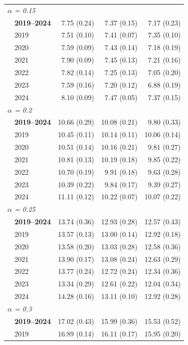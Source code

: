 \begin{table}[htbp]
\begin{tabular}{llrrr}
\midrule
\multicolumn{5}{l}{\textit{$\alpha$ = 0.15}} \\
 & \textbf{2019–2024} & 7.75 (0.24) & 7.37 (0.15) & 7.17 (0.23) \\
 & 2019 & 7.51 (0.10) & 7.41 (0.07) & 7.35 (0.10) \\
 & 2020 & 7.59 (0.09) & 7.43 (0.14) & 7.18 (0.19) \\
 & 2021 & 7.90 (0.09) & 7.45 (0.13) & 7.21 (0.16) \\
 & 2022 & 7.82 (0.14) & 7.25 (0.13) & 7.05 (0.20) \\
 & 2023 & 7.59 (0.16) & 7.20 (0.12) & 6.88 (0.19) \\
 & 2024 & 8.10 (0.09) & 7.47 (0.05) & 7.37 (0.15) \\
\midrule
\multicolumn{5}{l}{\textit{$\alpha$ = 0.2}} \\
 & \textbf{2019–2024} & 10.66 (0.29) & 10.08 (0.21) & 9.80 (0.33) \\
 & 2019 & 10.45 (0.11) & 10.14 (0.11) & 10.06 (0.14) \\
 & 2020 & 10.51 (0.14) & 10.16 (0.21) & 9.81 (0.27) \\
 & 2021 & 10.81 (0.13) & 10.19 (0.18) & 9.85 (0.22) \\
 & 2022 & 10.70 (0.19) & 9.91 (0.18) & 9.63 (0.28) \\
 & 2023 & 10.39 (0.22) & 9.84 (0.17) & 9.39 (0.27) \\
 & 2024 & 11.11 (0.12) & 10.22 (0.07) & 10.07 (0.22) \\
\midrule
\multicolumn{5}{l}{\textit{$\alpha$ = 0.25}} \\
 & \textbf{2019–2024} & 13.74 (0.36) & 12.93 (0.28) & 12.57 (0.43) \\
 & 2019 & 13.57 (0.13) & 13.00 (0.14) & 12.92 (0.18) \\
 & 2020 & 13.58 (0.20) & 13.03 (0.28) & 12.58 (0.36) \\
 & 2021 & 13.90 (0.17) & 13.08 (0.24) & 12.63 (0.29) \\
 & 2022 & 13.77 (0.24) & 12.72 (0.24) & 12.34 (0.36) \\
 & 2023 & 13.34 (0.29) & 12.61 (0.22) & 12.04 (0.34) \\
 & 2024 & 14.28 (0.16) & 13.11 (0.10) & 12.92 (0.28) \\
\midrule
\multicolumn{5}{l}{\textit{$\alpha$ = 0.3}} \\
 & \textbf{2019–2024} & 17.02 (0.43) & 15.99 (0.36) & 15.53 (0.52) \\
 & 2019 & 16.89 (0.14) & 16.11 (0.17) & 15.95 (0.20) \\

\end{tabular}
\end{table}
